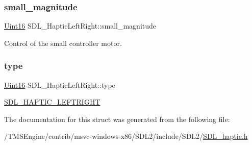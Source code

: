 \subsubsection{\texorpdfstring{small\+\_\+magnitude}{small\_magnitude}}
{\footnotesize\ttfamily \hyperlink{_s_d_l__stdinc_8h_a31fcc0a076c9068668173ee26d33e42b}{Uint16} S\+D\+L\+\_\+\+Haptic\+Left\+Right\+::small\+\_\+magnitude}

Control of the small controller motor. \mbox{\label{struct_s_d_l___haptic_left_right_abef79eeb482a8e623e512f0c9635e1a1}} 
\subsubsection{\texorpdfstring{type}{type}}
{\footnotesize\ttfamily \hyperlink{_s_d_l__stdinc_8h_a31fcc0a076c9068668173ee26d33e42b}{Uint16} S\+D\+L\+\_\+\+Haptic\+Left\+Right\+::type}

\hyperlink{_s_d_l__haptic_8h_ae047624d8458ff6400887c37a36f86d3}{S\+D\+L\+\_\+\+H\+A\+P\+T\+I\+C\+\_\+\+L\+E\+F\+T\+R\+I\+G\+HT} 

The documentation for this struct was generated from the following file\+:\begin{DoxyCompactItemize}
\item 
/\+T\+M\+S\+Engine/contrib/msvc-\/windows-\/x86/\+S\+D\+L2/include/\+S\+D\+L2/\hyperlink{_s_d_l__haptic_8h}{S\+D\+L\+\_\+haptic.\+h}\end{DoxyCompactItemize}
